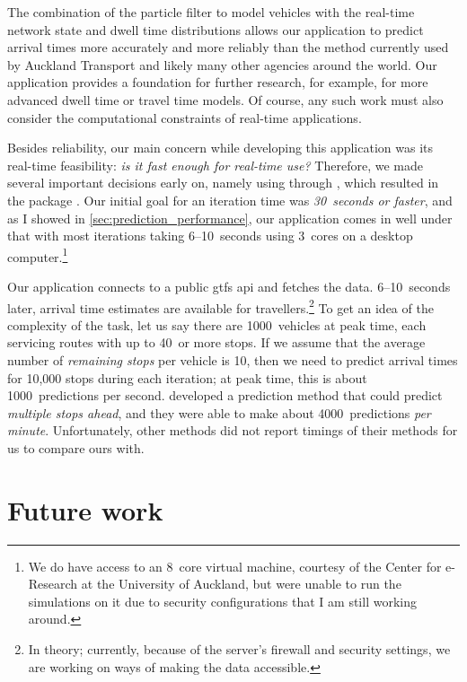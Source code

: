 The combination of the particle filter to model vehicles with the real-time network state and dwell time distributions allows our application to predict arrival times more accurately and more reliably than the method currently used by Auckland Transport and likely many other agencies around the world. Our application provides a foundation for further research, for example, for more advanced dwell time or travel time models. Of course, any such work must also consider the computational constraints of real-time applications.


Besides reliability, our main concern while developing this application was its real-time feasibility: \emph{is it fast enough for real-time use?} Therefore, we made several important decisions early on, namely using \Cpp{} through  \citep{Rcpp}, which resulted in the \Rstats{} package . Our initial goal for an iteration time was \emph{ 30~seconds or faster}, and as I showed in \cref{sec:prediction_performance}, our application comes in well under that with most iterations taking 6--10~seconds using 3~cores on a desktop computer.\footnote{We do have access to an 8~core virtual machine, courtesy of the Center for e-Research at the University of Auckland, but were unable to run the simulations on it due to security configurations that I am still working around.}


Our application connects to a public \gls{gtfs} \gls{api} and fetches the data. 6--10~seconds later, arrival time estimates are available for travellers.\footnote{In theory; currently, because of the server's firewall and security settings, we are working on ways of making the data accessible.} To get an idea of the complexity of the task, let us say there are 1000~vehicles at peak time, each servicing routes with up to 40~or more stops. If we assume that the average number of \emph{remaining stops} per vehicle is 10, then we need to predict arrival times for 10,000 stops during each iteration; at peak time, this is about 1000~predictions per second. \citet{Chang_2010} developed a prediction method that could predict \emph{multiple stops ahead}, and they were able to make about 4000~predictions \emph{per minute}. Unfortunately, other methods did not report timings of their methods for us to compare ours with.


\section{Future work}

